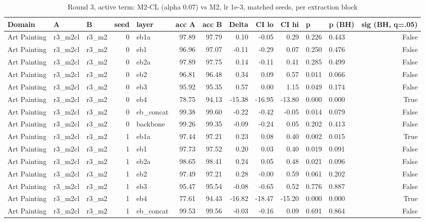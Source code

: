 \begin{table}
\caption{Round 3, active term: M2-CL (alpha 0.07) vs M2, lr 1e-3, matched seeds, per extraction block}
\label{tab:leak_r3_cl_effect_at_taps}
\begin{tabular}{lllrlrrrrrllr}
\toprule
Domain & A & B & seed & layer & acc A & acc B & Delta & CI lo & CI hi & p & p (BH) & sig (BH, q=.05) \\
\midrule
Art Painting & r3\_m2cl & r3\_m2 & 0 & eb1a & 97.89 & 97.79 & 0.10 & -0.05 & 0.29 & 0.226 & 0.443 & False \\
Art Painting & r3\_m2cl & r3\_m2 & 0 & eb1 & 96.96 & 97.07 & -0.11 & -0.29 & 0.07 & 0.250 & 0.476 & False \\
Art Painting & r3\_m2cl & r3\_m2 & 0 & eb2a & 97.89 & 97.75 & 0.14 & -0.11 & 0.41 & 0.285 & 0.499 & False \\
Art Painting & r3\_m2cl & r3\_m2 & 0 & eb2 & 96.81 & 96.48 & 0.34 & 0.09 & 0.57 & 0.011 & 0.066 & False \\
Art Painting & r3\_m2cl & r3\_m2 & 0 & eb3 & 95.92 & 95.35 & 0.57 & 0.00 & 1.15 & 0.049 & 0.174 & False \\
Art Painting & r3\_m2cl & r3\_m2 & 0 & eb4 & 78.75 & 94.13 & -15.38 & -16.95 & -13.80 & 0.000 & 0.000 & True \\
Art Painting & r3\_m2cl & r3\_m2 & 0 & eb\_concat & 99.38 & 99.60 & -0.22 & -0.42 & -0.05 & 0.014 & 0.079 & False \\
Art Painting & r3\_m2cl & r3\_m2 & 0 & backbone & 99.26 & 99.35 & -0.09 & -0.24 & 0.05 & 0.202 & 0.413 & False \\
Art Painting & r3\_m2cl & r3\_m2 & 1 & eb1a & 97.44 & 97.21 & 0.23 & 0.08 & 0.40 & 0.002 & 0.015 & True \\
Art Painting & r3\_m2cl & r3\_m2 & 1 & eb1 & 97.73 & 97.52 & 0.20 & 0.03 & 0.40 & 0.019 & 0.091 & False \\
Art Painting & r3\_m2cl & r3\_m2 & 1 & eb2a & 98.65 & 98.41 & 0.24 & 0.05 & 0.48 & 0.021 & 0.096 & False \\
Art Painting & r3\_m2cl & r3\_m2 & 1 & eb2 & 97.49 & 97.21 & 0.28 & -0.00 & 0.59 & 0.061 & 0.202 & False \\
Art Painting & r3\_m2cl & r3\_m2 & 1 & eb3 & 95.47 & 95.54 & -0.08 & -0.65 & 0.52 & 0.776 & 0.887 & False \\
Art Painting & r3\_m2cl & r3\_m2 & 1 & eb4 & 77.61 & 94.43 & -16.82 & -18.47 & -15.20 & 0.000 & 0.000 & True \\
Art Painting & r3\_m2cl & r3\_m2 & 1 & eb\_concat & 99.53 & 99.56 & -0.03 & -0.16 & 0.09 & 0.691 & 0.864 & False \\

\end{tabular}
\end{table}
